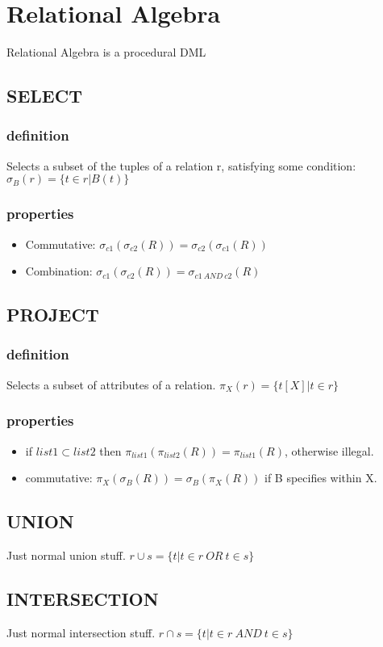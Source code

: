 \documentclass[a4paper]{scrartcl}
\newcommand{\set}[2]{\{#1|#2\}}
\begin{document}
\section{Relational Algebra}
  Relational Algebra is a procedural DML
  \subsection{SELECT}
    \subsubsection{definition}
      Selects a subset of the tuples of a relation r, satisfying some condition: $\sigma_B (r) = \{ t \in r | B(t) \}$
    \subsubsection{properties}
      \begin{itemize}
        \item Commutative: $\sigma_{c1}(\sigma_{c2}(R)) = \sigma_{c2}(\sigma_{c1}(R))$
        \item Combination: $\sigma_{c1}(\sigma_{c2}(R)) = \sigma_{c1~AND~c2}(R)$
      \end{itemize}
  \subsection{PROJECT}
    \subsubsection{definition}
      Selects a subset of attributes of a relation. $\pi_X(r) = \{t[X] | t \in r\}$
    \subsubsection{properties}
      \begin{itemize}
        \item if $list1 \subset list2$ then $\pi_{list1}(\pi_{list2}(R)) = \pi_{list1}(R)$, otherwise illegal.
        \item commutative: $\pi_{X}(\sigma_{B}(R)) = \sigma_{B}(\pi_{X}(R))$ if B specifies within X.
      \end{itemize}
  \subsection{UNION}
    Just normal union stuff. $r \cup s = \set{t}{t \in r~OR~t \in s }$
  \subsection{INTERSECTION}
    Just normal intersection stuff. $r \cap s = \set{t}{t \in r~AND~t \in s }$
\end{document}
